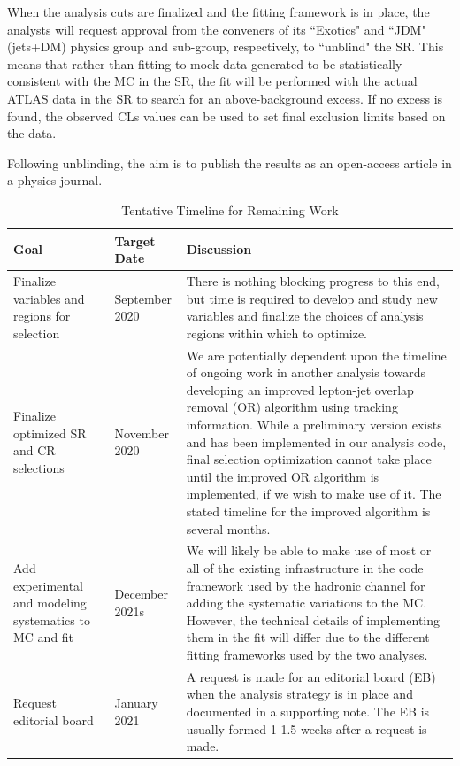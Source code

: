 \documentclass[12pt]{article}
\begin{document}
When the analysis cuts are finalized and the fitting framework is in place, the analysts will request approval from the conveners of its ``Exotics" and ``JDM" (jets+DM) physics group and sub-group, respectively, to ``unblind" the SR. This means that rather than fitting to mock data generated to be statistically consistent with the MC in the SR, the fit will be performed with the actual ATLAS data in the SR to search for an above-background excess. If no excess is found, the observed CLs values can be used to set final exclusion limits based on the data.  

Following unblinding, the aim is to publish the results as an open-access article in a physics journal.

\begin{table}[H]
\centering
\caption{Tentative Timeline for Remaining Work}
\label{tab:timeline}
\begin{footnotesize}
\renewcommand{\arraystretch}{1.5}
\begin{tabular}{|p{30mm}|p{20mm}|p{100mm}|}
\hline
\textbf{Goal} & \textbf{Target Date} & \textbf{Discussion}  \\ \hline
Finalize variables and regions for selection & September 2020  & There is nothing blocking progress to this end, but time is required to develop and study new variables and finalize the choices of analysis regions within which to optimize.     \\ \hline
Finalize optimized SR and CR selections & November 2020      &   We are potentially dependent upon the timeline of ongoing work in another analysis towards developing an improved lepton-jet overlap removal (OR) algorithm using tracking information. While a preliminary version exists and has been implemented in our analysis code, final selection optimization cannot take place until the improved OR algorithm is implemented, if we wish to make use of it. The stated timeline for the improved algorithm is several months.  \\ \hline
Add experimental and modeling systematics to MC and fit  & December 2021s & We will likely be able to make use of most or all of the existing infrastructure in the code framework used by the hadronic channel for adding the systematic variations to the MC. However, the technical details of implementing them in the fit will differ due to the different fitting frameworks used by the two analyses.        \\ \hline
Request editorial board & January 2021  & A request is made for an editorial board (EB) when the analysis strategy is in place and documented in a supporting note. The EB is usually formed 1-1.5 weeks after a request is made.    \\ \hline

\end{tabular}
\end{footnotesize}
\end{table}
\end{document}
